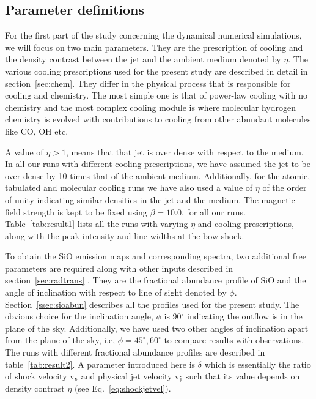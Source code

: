 \documentclass[useAMS,usenatbib,letters]{mn2e}
\begin{document}
\subsection{Parameter definitions}
\label{ssec:paradef}
For the first part of the study concerning the dynamical numerical
simulations, we will focus on two main parameters. They are the
prescription of cooling and the density contrast between the jet and
the ambient medium denoted by $\eta$. The various cooling prescriptions used for the present study are
described in detail in section~\ref{sec:chem}. They differ in the
physical process that is responsible for cooling and chemistry. The
most simple one is that of power-law cooling with no chemistry and the
most complex cooling module is where molecular hydrogen chemistry is
evolved with contributions to cooling from other abundant molecules
like CO, OH etc. 
%

A value of $\eta > 1$, means that
that jet is over dense with respect to the medium. In all our runs with
different cooling prescriptions, we have assumed the jet to be
over-dense by 10 times that of the ambient medium. Additionally, for
the atomic, tabulated and molecular cooling runs we have also used a
value of $\eta$ of the order of unity indicating similar densities in
the jet and the medium. 
The magnetic field strength is kept to be fixed using $\beta = 10.0$,
for all our runs. Table~\ref{tab:result1} lists all the runs with
varying $\eta$ and cooling prescriptions, along with the peak
intensity and line widths at the bow shock.
%

To obtain the SiO emission maps and corresponding
spectra, two additional free parameters are required along with other
inputs described in section~\ref{sec:radtrans} . They are
the fractional abundance profile of SiO and the angle of inclination with
respect to line of sight denoted by $\phi$. Section~\ref{ssec:sioabun}
describes all the profiles used for the present study. The obvious
choice for the inclination angle, $\phi$ is 90$^{\circ}$ indicating
the outflow is in the plane of the sky. 
Additionally, we have used two other angles of inclination apart from the
plane of the sky, i.e, $\phi = 45^{\circ}, 60^{\circ}$ to compare
results with observations. The runs with different fractional
abundance profiles are described in table~\ref{tab:result2}. A
parameter introduced here is $\delta$ which is essentially the ratio
of shock velocity v$_{\rm s}$ and physical jet velocity v$_{\rm
  j}$ such that its value depends on density contrast $\eta$
(see Eq.~\ref{eq:shockjetvel}).
\end{document}
